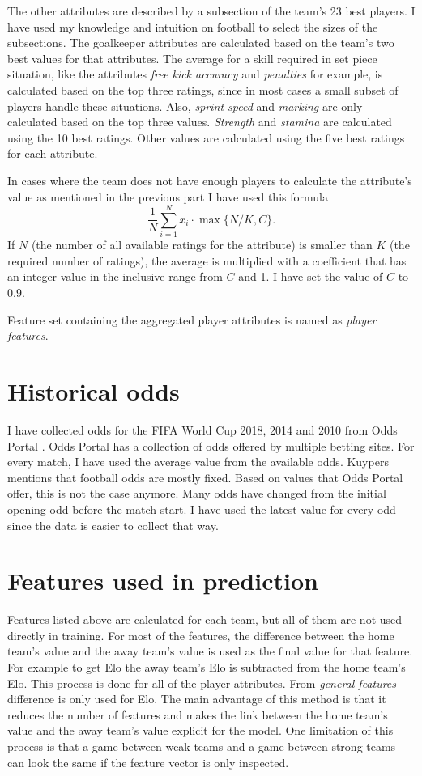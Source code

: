 The other attributes are described by a subsection of the team's 23 best players. I have used my knowledge and intuition on football to select the sizes of the subsections. The goalkeeper attributes are calculated based on the team's two best values for that attributes. The average for a skill required in set piece situation, like the attributes \textit{free kick accuracy} and \textit{penalties} for example, is calculated based on the top three ratings, since in most cases a small subset of players handle these situations. Also, \textit{sprint speed} and \textit{marking} are only calculated based on the top three values. \textit{Strength} and \textit{stamina} are calculated using the 10 best ratings. Other values are calculated using the five best ratings for each attribute.

In cases where the team does not have enough players to calculate the attribute's value as mentioned in the previous part I have used this formula
\begin{equation}
\frac{1}{N}\sum_{i=1}^{N}x_i \cdot \max{\{N/K, C\}}.
\end{equation}
If $N$ (the number of all available ratings for the attribute) is smaller than $K$ (the required number of ratings), the average is multiplied with a coefficient that has an integer value in the inclusive range from $C$ and 1. I have set the value of $C$ to 0.9.

Feature set containing the aggregated player attributes is named as \textit{player features}.

\section{Historical odds}
I have collected odds for the FIFA World Cup 2018, 2014 and 2010 from Odds Portal \cite{oddsportal}. Odds Portal has a collection of odds offered by multiple betting sites. For every match, I have used the average value from the available odds. Kuypers \cite{kuypers2008} mentions that football odds are mostly fixed. Based on values that Odds Portal offer, this is not the case anymore. Many odds have changed from the initial opening odd before the match start. I have used the latest value for every odd since the data is easier to collect that way.

\section{Features used in prediction}
Features listed above are calculated for each team, but all of them are not used directly in training. For most of the features, the difference between the home team's value and the away team's value is used as the final value for that feature. For example to get Elo the away team's Elo is subtracted from the home team's Elo. This process is done for all of the player attributes. From \textit{general features} difference is only used for Elo. The main advantage of this method is that it reduces the number of features and makes the link between the home team's value and the away team's value explicit for the model. One limitation of this process is that a game between weak teams and a game between strong teams can look the same if the feature vector is only inspected.

